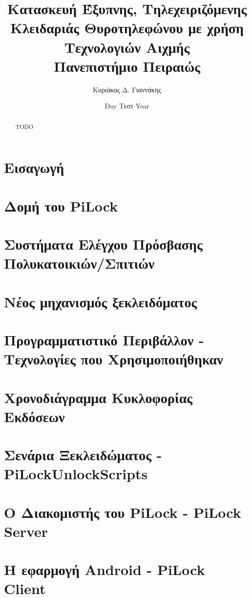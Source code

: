 \documentclass[12pt]{report}
\title{
    {Κατασκευή Έξυπνης, Τηλεχειριζόμενης Κλειδαριάς Θυροτηλεφώνου με χρήση Τεχνολογιών Αιχμής }\\
    {\large Πανεπιστήμιο Πειραιώς}
}
\author{Κυριάκος Δ. Γιαννάκης}
\date{Day Τεστ Year}
\begin{document}
    \maketitle
    
    \begin{abstract}
        TODO
    \end{abstract}
    
    \tableofcontents
    
    \chapter{Εισαγωγή}
    

    \chapter{Δομή του PiLock}
    

    \chapter{Συστήματα Ελέγχου Πρόσβασης Πολυκατοικιών/Σπιτιών}
    

    \chapter{Νέος μηχανισμός ξεκλειδόματος}
    

    \chapter{Προγραμματιστικό Περιβάλλον - Τεχνολογίες που Χρησιμοποιήθηκαν}
    

    \chapter{Χρονοδιάγραμμα Κυκλοφορίας Εκδόσεων}
    

    \chapter{Σενάρια Ξεκλειδώματος - PiLockUnlockScripts}
    

    \chapter{Ο Διακομιστής του PiLock - PiLock Server}
    

    \chapter{Η εφαρμογή Android - PiLock Client}
    

    
    
\end{document}
